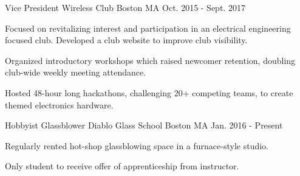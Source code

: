 

\begin{cventries}

  \cventry
    {Vice President} %
    {Wireless Club} %
    {Boston MA} %
    {Oct. 2015 - Sept. 2017} %
    {
      \begin{cvitems} %
        \item {Focused on revitalizing interest and participation in an electrical engineering focused club. Developed a club website to improve club visibility.}
        \item {Organized introductory workshops which raised newcomer retention, doubling club-wide weekly meeting attendance.}
        \item {Hosted 48-hour long hackathons, challenging 20+ competing teams, to create themed electronics hardware.}
      \end{cvitems}
    }
    
    \cventry
    {Hobbyist Glassblower} %
    {Diablo Glass School} %
    {Boston MA} %
    {Jan. 2016 - Present} %
    {
      \begin{cvitems} %
        \item {Regularly rented hot-shop glassblowing space in a furnace-style studio.}
        \item {Only student to receive offer of apprenticeship from instructor.}
      \end{cvitems}
    }

\end{cventries}
